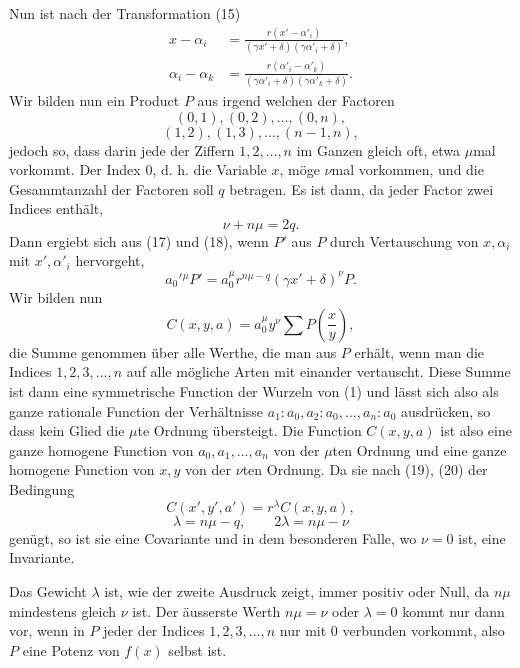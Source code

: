 \documentclass[11pt]{article}
\begin{document}
Nun ist nach der Transformation (15)
\begin{equation}
\begin{aligned}
 x-\alpha_i&=\frac{r(x'-\alpha'_i)}{(\gamma x'+\delta)(\gamma\alpha'_i+\delta)},\\
 \alpha_i-\alpha_k&=\frac{r(\alpha'_i-\alpha'_k)}{(\gamma\alpha'_i+\delta)(\gamma\alpha'_k+\delta)}.
\end{aligned}
\tag{18}
\end{equation}
Wir bilden nun ein Product $P$ aus irgend welchen der Factoren
\[
 (0,1),(0,2),\ldots,(0,n),
\]
\[
 (1,2),(1,3),\ldots,(n-1,n),
\]
jedoch so, dass darin jede der Ziffern $1,2,\ldots,n$ im Ganzen gleich oft, etwa $\mu$mal vorkommt. Der Index $0$, d. h. die Variable $x$, möge $\nu$mal vorkommen, und die Gesammtanzahl der Factoren soll $q$ betragen. Es ist dann, da jeder Factor zwei Indices enthält,
\begin{equation}
 \nu+n\mu=2q.
\tag{19}
\end{equation}
Dann ergiebt sich aus (17) und (18), wenn $P'$ aus $P$ durch Vertauschung von $x,\alpha_i$ mit $x',\alpha'_i$ hervorgeht,
\begin{equation}
 a_0'{}^\mu P'=a_0^\mu r^{n\mu-q}(\gamma x'+\delta)^\nu P.
\tag{20}
\end{equation}
Wir bilden nun
\begin{equation}
 C(x,y,a)=a_0^\mu y^\nu\sum P\left(\frac{x}{y}\right),
\tag{21}
\end{equation}
die Summe genommen über alle Werthe, die man aus $P$ erhält, wenn man die Indices $1,2,3,\ldots,n$ auf alle mögliche Arten mit einander vertauscht. Diese Summe ist dann eine symmetrische Function der Wurzeln von (1) und lässt sich also als ganze rationale Function der Verhältnisse $a_1:a_0,a_2:a_0,\ldots,a_n:a_0$ ausdrücken, so dass kein Glied die $\mu$te Ordnung übersteigt. Die Function $C(x,y,a)$ ist also eine ganze homogene Function von $a_0,a_1,\ldots,a_n$ von der $\mu$ten Ordnung und eine ganze homogene Function von $x,y$ von der $\nu$ten Ordnung. Da sie nach (19), (20) der Bedingung
\begin{equation}
 C(x',y',a')=r^\lambda C(x,y,a),
\tag{22}
\end{equation}
\begin{equation}
 \lambda=n\mu-q,
 \qquad
 2\lambda=n\mu-\nu
\tag{23}
\end{equation}
genügt, so ist sie eine Covariante und in dem besonderen Falle, wo $\nu=0$ ist, eine Invariante.

Das Gewicht $\lambda$ ist, wie der zweite Ausdruck zeigt, immer positiv oder Null, da $n\mu$ mindestens gleich $\nu$ ist. Der äusserste Werth $n\mu=\nu$ oder $\lambda=0$ kommt nur dann vor, wenn in $P$ jeder der Indices $1,2,3,\ldots,n$ nur mit $0$ verbunden vorkommt, also $P$ eine Potenz von $f(x)$ selbst ist.
\end{document}
